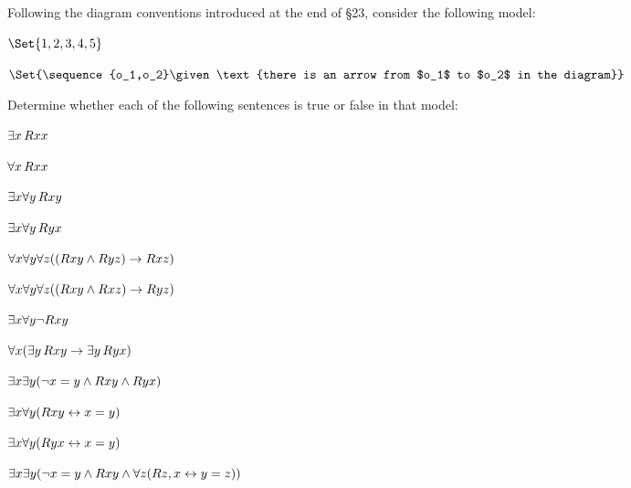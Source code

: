\begin{practiceproblems}
\problempart
\label{pr.TorF3}
Following the diagram conventions introduced at the end of \S23, consider the following model:	
\begin{interp}
	\item[\domain] $\Set{1,2,3,4,5}$
	\item[\denote{R}] $\Set{\sequence{o_1,o_2}\given\text{there is an arrow from $o_1$ to $o_2$ in the diagram}}$
\end{interp}
\begin{center}
\end{center}
Determine whether each of the following sentences is true or false in that model:
\begin{earg}
\item $\exists x\,\mathord{R}x x$ \hfill {}
\item $\forall x\,\mathord{R}x x$ \hfill {}
\item $\exists x \forall y\,\mathord{R}x y$ \hfill {}
\item $\exists x \forall y\,\mathord{R}y x$ \hfill {}
\item $\forall x \forall y \forall z ((\mathord{R}x y \mathbin{\wedge} \mathord{R}y z) \rightarrow \mathord{R}x z)$ \hfill {}
\item $\forall x \forall y \forall z ((\mathord{R}x y \mathbin{\wedge} \mathord{R}x z) \rightarrow \mathord{R}y z)$ \hfill {}
\item $\exists x \forall y \neg \mathord{R}x y$ \hfill {}
\item $\forall x(\exists y\,\mathord{R}x y \rightarrow \exists y\,\mathord{R}y x)$ \hfill {}
\item $\exists x \exists y (\neg x = y \mathbin{\wedge} \mathord{R}x y \mathbin{\wedge} \mathord{R}y x)$ \hfill {}
\item $\exists x \forall y(\mathord{R}x y \leftrightarrow x = y)$ \hfill {}
\item $\exists x \forall y(\mathord{R}y x \leftrightarrow x = y)$ \hfill {}
\item $\exists x \exists y(\neg x = y \mathbin{\wedge} \mathord{R}x y \mathbin{\wedge} \forall z(\mathord{R}z,x \leftrightarrow y = z))$ \hfill {}
\end{earg}
\end{practiceproblems}

